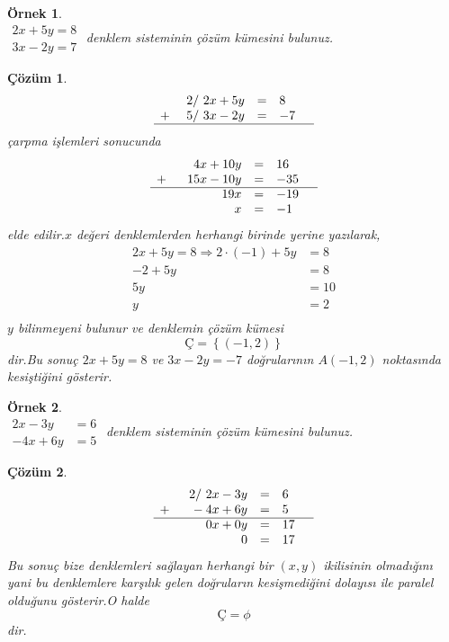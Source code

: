 \documentclass[a4paper,10pt]{book}
\theoremstyle{italik}
\newtheorem{ornek}{Örnek}[chapter]
\newtheorem*{cozum}{Çözüm}
\begin{document}
\begin{ornek}
	\quad\\
	$
	\begin{aligned}
		2x+5y=8 \\
		3x-2y=7
	\end{aligned}
	$
	\quad denklem sisteminin çözüm kümesini bulunuz.
\end{ornek}

\begin{cozum}
	$$
	\begin{array}{rclc}
		2/ \ 2x+5y &=& 8 & \\
		+\quad\  5/ \ 3x-2y &=& -7 &\\ \cline{1-4} 
	\end{array}
	$$
	çarpma işlemleri sonucunda
	$$
	\begin{array}{rclc}
		4x+10y &=& 16 & \\
		+\quad\  \ 15x-10y &=& -35 &\\ \cline{1-4}
		19x &=& -19 & \\
		x   &=& -1  &
	\end{array}
	$$
	elde edilir.$x$ değeri denklemlerden herhangi birinde yerine yazılarak,
	$$
	\begin{aligned}
		2x+5y=8 \Rightarrow 2\cdot(-1)+5y & = 8  \\
		                            -2+5y & = 8  \\
					       5y & = 10 \\
					        y & = 2  \\
	\end{aligned}
	$$
	$y$ bilinmeyeni bulunur ve denklemin çözüm kümesi
	$$
	\text{Ç}=\left\{(-1,2)\right\}
	$$
	dir.Bu sonuç $2x+5y=8$ ve $3x-2y=-7$ doğrularının $A(-1,2)$ noktasında kesiştiğini gösterir.
\end{cozum}
			

\begin{ornek}
	\quad\\
	$
	\begin{aligned}
		2x-3y  & = 6 \\
		-4x+6y & = 5
	\end{aligned}
	$
	\quad denklem sisteminin çözüm kümesini bulunuz.
\end{ornek}

\begin{cozum}
	$$
	\begin{array}{rclc}
		2/ \ 2x-3y          & = & 6  & \\
		+\quad\ \ -4x+6y    & = & 5  & \\ \cline{1-4}
		0x+0y		    & = & 17 & \\
		0		    & = & 17 &
	\end{array}
	$$
	Bu sonuç bize denklemleri sağlayan herhangi bir $(x,y)$ ikilisinin olmadığını yani bu denklemlere karşılık
	gelen doğruların kesişmediğini dolayısı ile paralel olduğunu gösterir.O halde
	$$
	\text{Ç}=\phi
	$$
	dir.
\end{cozum}
\end{document}
